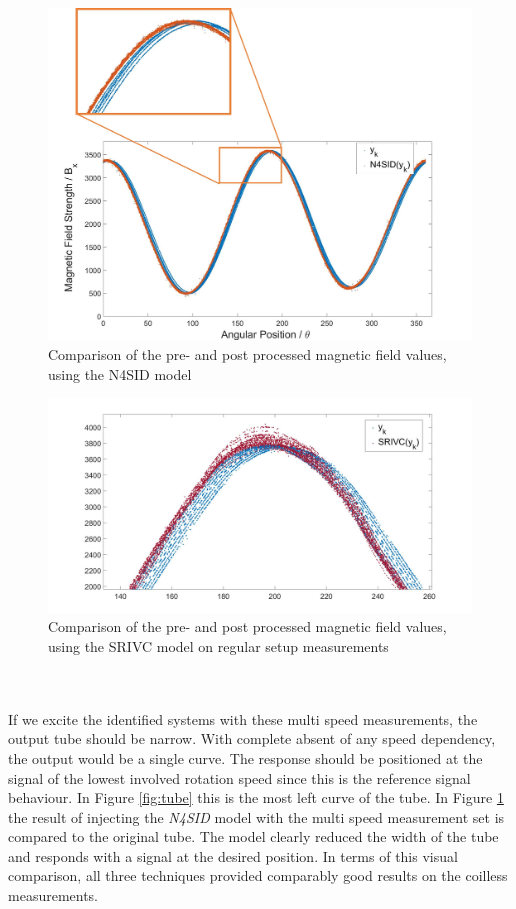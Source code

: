 \documentclass[english]{isasthesis}
\begin{document}
    		\begin{figure}[p]
    		\centering
    		\includegraphics[width=1\textwidth]{figures/curve_tube_n4sid.jpg}   
    		\caption{Comparison of the pre- and post processed magnetic field values, using the N4SID model}
    		\label{fig:tube n4sid}
    		\end{figure} 
    		\begin{figure}[p]
    		\centering
    		\includegraphics[width=1\textwidth]{figures/curve_multiple_SRIVC_position.jpg}   
    		\caption{Comparison of the pre- and post processed magnetic field values, using the SRIVC model on regular setup measurements}
    		\label{fig:tube SRIVC position obne}
    		\end{figure} 
  		  	\\\\If we excite the identified systems with these multi speed measurements, the output tube should be narrow. With complete absent of any speed dependency, the output would be a single curve. The response should be positioned at the signal of the lowest involved rotation speed since this is the reference signal behaviour. In Figure \ref{fig:tube} this is the most left curve of the tube. In Figure \ref{fig:tube n4sid} the result of injecting the \textit{N4SID} model with the multi speed measurement set is compared to the original tube. The model clearly reduced the width of the tube and responds with a signal at the desired position. In terms of this visual comparison, all three techniques provided comparably good results on the coilless measurements.  		
\end{document}
